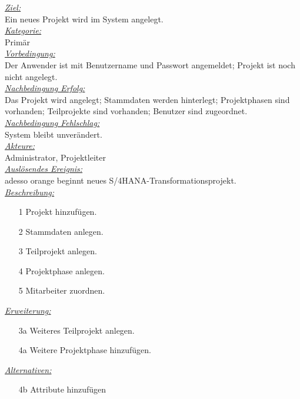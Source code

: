 \underline{\emph{Ziel:}}\\
Ein neues Projekt wird im System angelegt.\\
\underline{\emph{Kategorie:}} \\
Primär\\
\underline{\emph{Vorbedingung:}} \\
Der Anwender ist mit Benutzername und Passwort angemeldet; Projekt ist noch nicht angelegt.\\
\underline{\emph{Nachbedingung Erfolg:}} \\
Das Projekt wird angelegt; Stammdaten werden hinterlegt; Projektphasen sind vorhanden; Teilprojekte sind vorhanden; Benutzer sind zugeordnet.\\
\underline{\emph{Nachbedingung Fehlschlag:}} \\
System bleibt unverändert.\\
\underline{\emph{Akteure:}} \\
Administrator, Projektleiter\\
\underline{\emph{Auslösendes Ereignis:}} \\
adesso orange beginnt neues S/4HANA-Transformationsprojekt.\\
\underline{\emph{Beschreibung:}}
\begin{itemize}
    \item [1] Projekt hinzufügen.
    \item [2] Stammdaten anlegen.
    \item [3] Teilprojekt anlegen.
    \item [4] Projektphase anlegen.
    \item [5] Mitarbeiter zuordnen.
\end{itemize}
\underline{\emph{Erweiterung:}}
\begin{itemize}
    \item [3a] Weiteres Teilprojekt anlegen. 
    \item [4a] Weitere Projektphase hinzufügen.
\end{itemize}
\underline{\emph{Alternativen:}}
\begin{itemize}
    \item [4b] Attribute hinzufügen
\end{itemize}

